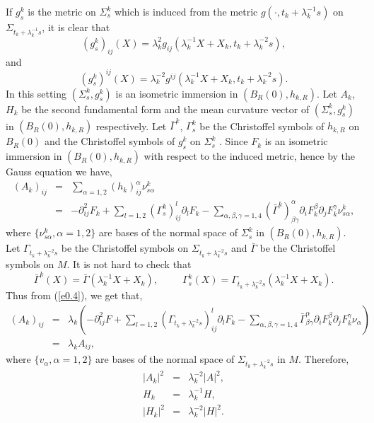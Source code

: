 If $g^k_s$ is the metric on $\Sigma^k_s$ which is induced from the
metric $g(\cdot, t_k+\lambda^{-1}_k s)$ on
$\Sigma_{t_k+\lambda_k^{-1}s}$, it is clear that
$$ (g^k_s)_{ij}(X)=\lambda_k^2 g_{ij}(\lambda_k^{-1}X+X_k,
t_k+\lambda_k^{-2}s),
$$ and
$$ (g^k_s)^{ij}(X)=\lambda_k^{-2} g^{ij}(\lambda_k^{-1}X+X_k,
t_k+\lambda_k^{-2}s).
$$ In this setting $(\Sigma^k_s, g_s^k)$ is an isometric immersion in
$(B_R(0), h_{k, R})$. Let $A_k$, $H_k$ be the second fundamental
form and the mean curvature vector of $(\Sigma^k_s, g^k_s)$ in
$(B_R(0), h_{k, R})$ respectively. Let $\bar\Gamma^k$,
$\Gamma^k_s$ be the Christoffel symbols of $h_{k, R}$ on $B_R(0)$
and the Christoffel symbols of $g^k_s$ on $\Sigma^k_s$ . Since
$F_k$ is an isometric immersion in $(B_R(0), h_{k, R})$ with
respect to the induced metric, hence by the Gauss equation we
have,
\begin{eqnarray}\label{e0.4}
(A_k)_{ij} &=& \sum_{\alpha=1, 2}(h_k)_{ij}^\alpha \nu^k_{s\alpha}
\nonumber\\ &=& -\partial^2_{ij} F_k +\sum_{l=1,
2}(\Gamma^k_s)^l_{ij}\partial_l F_k-\sum_{\alpha,\beta,\gamma=1,
4}(\bar\Gamma^k)^\alpha_{\beta\gamma}\partial_i F^\beta_k
\partial_j F^\gamma_k \nu^k_{s\alpha},
\end{eqnarray} where $\{\nu^k_{s\alpha},\alpha=1, 2\}$ are bases of the normal
space of $\Sigma^k_s$ in $(B_R(0), h_{k, R})$. Let
$\Gamma_{t_k+\lambda_k^{-2}s}$ be the Christoffel symbols on
$\Sigma_{t_k+\lambda_k^{-2}s}$ and $\bar\Gamma$ be the Christoffel
symbols on $M$. It is not hard to check that
$$\bar\Gamma^k(X)=\bar\Gamma(\lambda_k^{-1}X+X_k),~~~~~~~~~~~
\Gamma^k_s(X)=\Gamma_{t_k+\lambda_k^{-2}s}(\lambda_k^{-1}X+X_k).
$$ Thus from (\ref{e0.4}), we get that,
\begin{eqnarray}\label{e0.5}
(A_k)_{ij} &=& \lambda_k(-\partial^2_{ij} F+\sum_{l=1,
2}(\Gamma_{t_k+\lambda_k^{-2}s})^l_{ij}\partial_l
F_k-\sum_{\alpha,\beta,\gamma=1,
4}\bar\Gamma^\alpha_{\beta\gamma}\partial_i F^\beta_k
\partial_j F^\gamma_k \nu_\alpha )\nonumber\\ &=& \lambda_k A_{ij},
\end{eqnarray} where $\{v_\alpha, \alpha=1, 2\}$ are bases of the normal space of
$\Sigma_{t_k+\lambda_k^{-2}s}$ in $M$.  Therefore,
\begin{eqnarray*}
|A_k|^2 &=&\lambda_k^{-2}|A|^2,\\
H_k&=&\lambda_k^{-1}H,\\ |H_k|^2 &=&\lambda_k^{-2}|H|^2.
\end{eqnarray*}

